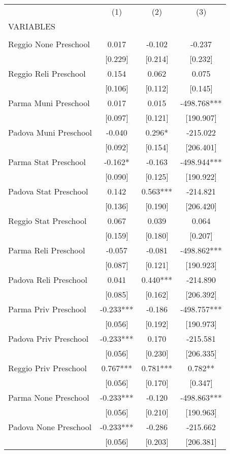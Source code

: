 \begin{tabular}{lccc} \hline
 & (1) & (2) & (3) \\
VARIABLES &  &  &  \\ \hline
 &  &  &  \\
Reggio None Preschool & 0.017 & -0.102 & -0.237 \\
 & [0.229] & [0.214] & [0.232] \\
Reggio Reli Preschool & 0.154 & 0.062 & 0.075 \\
 & [0.106] & [0.112] & [0.145] \\
Parma Muni Preschool & 0.017 & 0.015 & -498.768*** \\
 & [0.097] & [0.121] & [190.907] \\
Padova Muni Preschool & -0.040 & 0.296* & -215.022 \\
 & [0.092] & [0.154] & [206.401] \\
Parma Stat Preschool & -0.162* & -0.163 & -498.944*** \\
 & [0.090] & [0.125] & [190.922] \\
Padova Stat Preschool & 0.142 & 0.563*** & -214.821 \\
 & [0.136] & [0.190] & [206.420] \\
Reggio Stat Preschool & 0.067 & 0.039 & 0.064 \\
 & [0.159] & [0.180] & [0.207] \\
Parma Reli Preschool & -0.057 & -0.081 & -498.862*** \\
 & [0.087] & [0.121] & [190.923] \\
Padova Reli Preschool & 0.041 & 0.440*** & -214.890 \\
 & [0.085] & [0.162] & [206.392] \\
Parma Priv Preschool & -0.233*** & -0.186 & -498.757*** \\
 & [0.056] & [0.192] & [190.973] \\
Padova Priv Preschool & -0.233*** & 0.170 & -215.581 \\
 & [0.056] & [0.230] & [206.335] \\
Reggio Priv Preschool & 0.767*** & 0.781*** & 0.782** \\
 & [0.056] & [0.170] & [0.347] \\
Parma None Preschool & -0.233*** & -0.120 & -498.863*** \\
 & [0.056] & [0.210] & [190.963] \\
Padova None Preschool & -0.233*** & -0.286 & -215.662 \\
 & [0.056] & [0.203] & [206.381] \\

\end{tabular}
